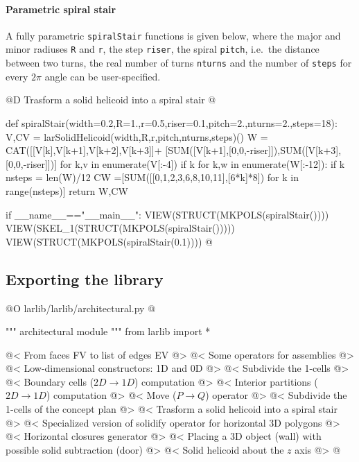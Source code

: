 \documentclass[11pt,oneside]{article}    %
\begin{document}
\paragraph{Parametric spiral stair}

A fully parametric \texttt{spiralStair} functions is given below, where the major and minor radiuses \texttt{R} and \texttt{r}, the step \texttt{riser}, the spiral \texttt{pitch}, i.e.~the distance between two turns, the real number of turns \texttt{nturns} and the number of \texttt{steps} for every $2\pi$ angle can be user-specified.

@D Trasform a solid helicoid into a spiral stair
@{def spiralStair(width=0.2,R=1.,r=0.5,riser=0.1,pitch=2.,nturns=2.,steps=18):
    V,CV = larSolidHelicoid(width,R,r,pitch,nturns,steps)()
    W = CAT([[V[k],V[k+1],V[k+2],V[k+3]]+
        [SUM([V[k+1],[0,0,-riser]]),SUM([V[k+3],[0,0,-riser]])]
        for k,v in enumerate(V[:-4]) if k%
    for k,w in enumerate(W[:-12]):
        if k%
    nsteps = len(W)/12
    CW =[SUM([[0,1,2,3,6,8,10,11],[6*k]*8]) for k in range(nsteps)]
    return W,CW

if __name__=="__main__":
    VIEW(STRUCT(MKPOLS(spiralStair())))
    VIEW(SKEL_1(STRUCT(MKPOLS(spiralStair()))))
    VIEW(STRUCT(MKPOLS(spiralStair(0.1))))
@}




\subsection{Exporting the library}

@O larlib/larlib/architectural.py
@{""" architectural module """
from larlib import *

@< From faces FV to list of edges EV @>
@< Some operators for assemblies @>
@< Low-dimensional constructors: 1D and 0D @>
@< Subdivide the 1-cells @>
@< Boundary cells ($2D\to 1D$) computation @>
@< Interior partitions ($2D\to 1D$) computation @>
@< Move ($P\to Q$) operator @>
@< Subdivide the 1-cells of the concept plan @>
@< Trasform a solid helicoid into a spiral stair @>
@< Specialized version of solidify operator for horizontal 3D polygons @>
@< Horizontal closures generator @>
@< Placing a 3D object (wall) with possible solid subtraction (door) @>
@< Solid helicoid about the $z$ axis @>
@}
\end{document}
